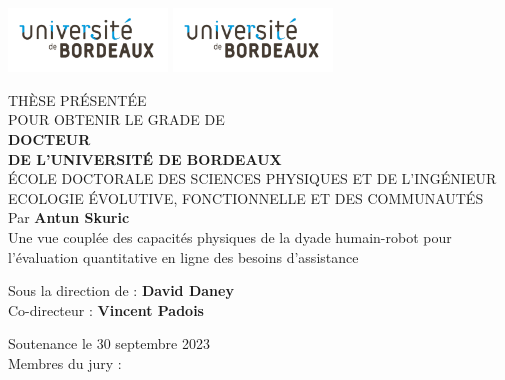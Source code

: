 \documentclass[french,12pt,a4paper]{report}
\begin{document}
\pagestyle{empty}
\includegraphics[scale=1, height=1.7cm]{first_page/brdx.pdf}
\hfill
\includegraphics[scale=1, height=1.7cm]{first_page/brdx.pdf}
\hfill
\begin{center}
\doublespacing
\begin{Large}

THÈSE PRÉSENTÉE\\ POUR OBTENIR LE GRADE DE \\
{\LARGE \textbf{DOCTEUR\\DE L'UNIVERSITÉ DE BORDEAUX} } \\
\vspace{0.55cm}
ÉCOLE DOCTORALE DES SCIENCES PHYSIQUES ET DE L’INGÉNIEUR \\
{\normalsize ECOLOGIE ÉVOLUTIVE, FONCTIONNELLE ET DES COMMUNAUTÉS} \\
\vspace{0.55cm}
Par \textbf{Antun Skuric} \\
\vspace{0.55cm}
{\Large Une vue couplée des capacités physiques de la dyade humain-robot pour l'évaluation quantitative en ligne des besoins d'assistance}
\end{Large}
\vspace{0.55cm}
\begin{normalsize}
\begin{singlespace}
Sous la direction de : \textbf{David Daney}\\
Co-directeur : \textbf{Vincent Padois}
\end{singlespace}
\end{normalsize}
\end{center}
\vfill
{\large Soutenance le 30 septembre 2023 }\\
\vfill
Membres du jury :
\end{document}
